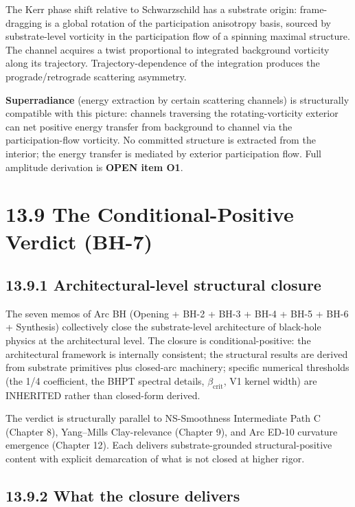 \documentclass[11pt]{book}
\begin{document}
The Kerr phase shift relative to Schwarzschild has a substrate origin: frame-dragging is a global rotation of the participation anisotropy basis, sourced by substrate-level vorticity in the participation flow of a spinning maximal structure. The channel acquires a twist proportional to integrated background vorticity along its trajectory. Trajectory-dependence of the integration produces the prograde/retrograde scattering asymmetry.

\textbf{Superradiance} (energy extraction by certain scattering channels) is structurally compatible with this picture: channels traversing the rotating-vorticity exterior can net positive energy transfer from background to channel via the participation-flow vorticity. No committed structure is extracted from the interior; the energy transfer is mediated by exterior participation flow. Full amplitude derivation is \textbf{OPEN item O1}.

\section{13.9 The Conditional-Positive Verdict (BH-7)}

\subsection{13.9.1 Architectural-level structural closure}

The seven memos of Arc BH (Opening + BH-2 + BH-3 + BH-4 + BH-5 + BH-6 + Synthesis) collectively close the substrate-level architecture of black-hole physics at the architectural level. The closure is conditional-positive: the architectural framework is internally consistent; the structural results are derived from substrate primitives plus closed-arc machinery; specific numerical thresholds (the 1/4 coefficient, the BHPT spectral details, $\beta_\mathrm{crit}$, V1 kernel width) are INHERITED rather than closed-form derived.

The verdict is structurally parallel to NS-Smoothness Intermediate Path C (Chapter 8), Yang–Mills Clay-relevance (Chapter 9), and Arc ED-10 curvature emergence (Chapter 12). Each delivers substrate-grounded structural-positive content with explicit demarcation of what is not closed at higher rigor.

\subsection{13.9.2 What the closure delivers}
\end{document}
